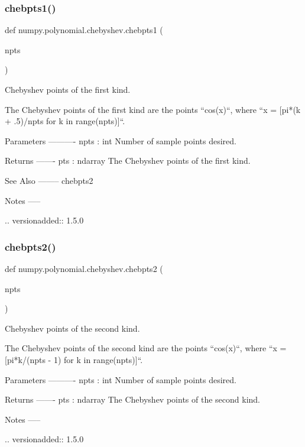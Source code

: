 \subsubsection{\texorpdfstring{chebpts1()}{chebpts1()}}
{\footnotesize\ttfamily def numpy.\+polynomial.\+chebyshev.\+chebpts1 (\begin{DoxyParamCaption}\item[{}]{npts }\end{DoxyParamCaption})}

\begin{DoxyVerb}Chebyshev points of the first kind.

The Chebyshev points of the first kind are the points ``cos(x)``,
where ``x = [pi*(k + .5)/npts for k in range(npts)]``.

Parameters
----------
npts : int
    Number of sample points desired.

Returns
-------
pts : ndarray
    The Chebyshev points of the first kind.

See Also
--------
chebpts2

Notes
-----

.. versionadded:: 1.5.0\end{DoxyVerb}
 \mbox{\label{namespacenumpy_1_1polynomial_1_1chebyshev_a600cdccc553203b663ebdaa43663d8f2}} 
\subsubsection{\texorpdfstring{chebpts2()}{chebpts2()}}
{\footnotesize\ttfamily def numpy.\+polynomial.\+chebyshev.\+chebpts2 (\begin{DoxyParamCaption}\item[{}]{npts }\end{DoxyParamCaption})}

\begin{DoxyVerb}Chebyshev points of the second kind.

The Chebyshev points of the second kind are the points ``cos(x)``,
where ``x = [pi*k/(npts - 1) for k in range(npts)]``.

Parameters
----------
npts : int
    Number of sample points desired.

Returns
-------
pts : ndarray
    The Chebyshev points of the second kind.

Notes
-----

.. versionadded:: 1.5.0\end{DoxyVerb}
 \mbox{\label{namespacenumpy_1_1polynomial_1_1chebyshev_a2ae2563bc0a4f56421d9c39006e6009c}} 
